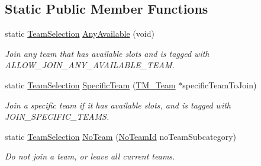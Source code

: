 \subsection*{Static Public Member Functions}
\begin{DoxyCompactItemize}
\item 
static \hyperlink{struct_rak_net_1_1_team_selection}{Team\-Selection} \hyperlink{struct_rak_net_1_1_team_selection_aa5a3260b26e6efa68bd019a3df94cdaf}{Any\-Available} (void)
\begin{DoxyCompactList}\small\item\em Join any team that has available slots and is tagged with A\-L\-L\-O\-W\-\_\-\-J\-O\-I\-N\-\_\-\-A\-N\-Y\-\_\-\-A\-V\-A\-I\-L\-A\-B\-L\-E\-\_\-\-T\-E\-A\-M. \end{DoxyCompactList}\item 
static \hyperlink{struct_rak_net_1_1_team_selection}{Team\-Selection} \hyperlink{struct_rak_net_1_1_team_selection_acd3b970f35fa016ee969981f6d4ea1ab}{Specific\-Team} (\hyperlink{class_rak_net_1_1_t_m___team}{T\-M\-\_\-\-Team} $\ast$specific\-Team\-To\-Join)
\begin{DoxyCompactList}\small\item\em Join a specific team if it has available slots, and is tagged with J\-O\-I\-N\-\_\-\-S\-P\-E\-C\-I\-F\-I\-C\-\_\-\-T\-E\-A\-M\-S. \end{DoxyCompactList}\item 
static \hyperlink{struct_rak_net_1_1_team_selection}{Team\-Selection} \hyperlink{struct_rak_net_1_1_team_selection_a1431b86590b2231b7b8f833d58c62699}{No\-Team} (\hyperlink{group___t_e_a_m___m_a_n_a_g_e_r___g_r_o_u_p_gadd1e99b7724ceb0f6794f46de31a6b02}{No\-Team\-Id} no\-Team\-Subcategory)
\begin{DoxyCompactList}\small\item\em Do not join a team, or leave all current teams. \end{DoxyCompactList}\end{DoxyCompactItemize}
